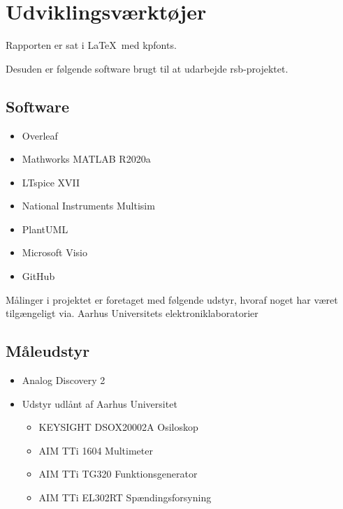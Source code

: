 \section{Udviklingsværktøjer}
Rapporten er sat i \LaTeX~med kpfonts.

Desuden er følgende software brugt til at udarbejde \gls{rsb}-projektet.
\subsection{Software}
\begin{itemize}
    \item Overleaf
    \item Mathworks MATLAB R2020a
    \item LTspice XVII
    \item National Instruments Multisim
    \item PlantUML
    \item Microsoft Visio
    \item GitHub
\end{itemize}

Målinger i projektet er foretaget med følgende udstyr, hvoraf noget har været tilgængeligt via. Aarhus Universitets elektroniklaboratorier 
\subsection{Måleudstyr}
\begin{itemize}
\item Analog Discovery 2
\item Udstyr udlånt af Aarhus Universitet
\begin{itemize}
\item KEYSIGHT DSOX20002A Osiloskop
\item AIM TTi 1604 Multimeter
\item AIM TTi TG320 Funktionsgenerator
\item AIM TTi EL302RT Spændingsforsyning
\end{itemize}
\end{itemize} 